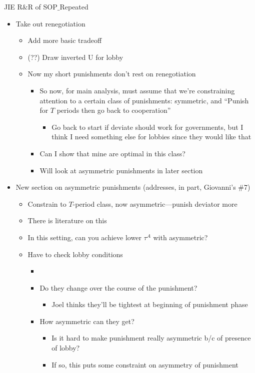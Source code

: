 \documentclass[12pt]{article}
\begin{document}
\begin{center}
JIE R$\&$R of SOP$\_$Repeated
\end{center}



\begin{itemize}
	\item Take out renegotiation
		\begin{itemize}
			\item Add more basic tradeoff
			\item (??) Draw inverted U for lobby
			\item Now my short punishments don't rest on renegotiation
				\begin{itemize}
					\item So now, for main analysis, must assume that we're constraining attention to a certain class of punishments: symmetric, and ``Punish for $T$ periods then go back to cooperation''
						\begin{itemize}
							\item Go back to start if deviate should work for governments, but I think I need something else for lobbies since they would like that
						\end{itemize}
					\item Can I show that mine are optimal in this class?
					\item Will look at asymmetric punishments in later section
				\end{itemize}
		\end{itemize}
	
	\item New section on asymmetric punishments (addresses, in part, Giovanni's $\#$7)
		\begin{itemize}
			\item Constrain to $T$-period class, now asymmetric---punish deviator more
			\item There is literature on this
			\item In this setting, can you achieve lower $\tau^A$ with asymmetric?
			\item Have to check lobby conditions
				\begin{itemize}
					\item \item Do they change over the course of the punishment?
						\begin{itemize}
							\item Joel thinks they'll be tightest at beginning of punishment phase
						\end{itemize}
					\item How asymmetric can they get?
						\begin{itemize}
							\item Is it hard to make punishment really asymmetric b/c of presence of lobby?
							\item If so, this puts some constraint on asymmetry of punishment
						\end{itemize}
				\end{itemize}
		\end{itemize}
	

\end{itemize}
\end{document}
